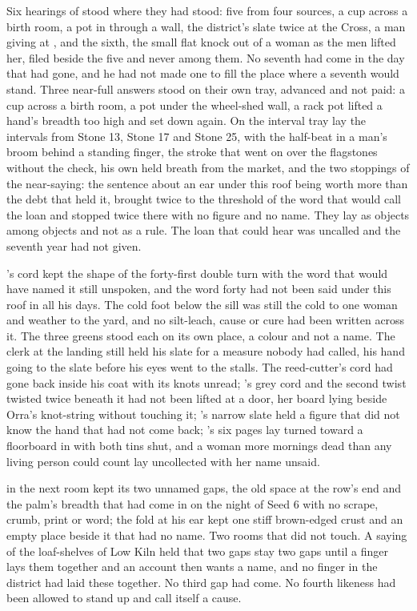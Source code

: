 Six hearings of  stood where they had stood: five from four sources, a cup across a birth room, a pot in  through a wall, the district's slate twice at the Cross, a man giving at , and the sixth, the small flat knock out of a woman as the men lifted her, filed beside the five and never among them. No seventh had come in the day that had gone, and he had not made one to fill the place where a seventh would stand. Three near-full answers stood on their own tray, advanced and not paid: a cup across a birth room, a pot under the wheel-shed wall, a rack pot lifted a hand's breadth too high and set down again. On the interval tray lay the intervals from Stone 13, Stone 17 and Stone 25, with the half-beat in a man's broom behind a standing finger, the stroke that went on over the flagstones without the check, his own held breath from the market, and the two stoppings of the near-saying: the sentence about an ear under this roof being worth more than the debt that held it, brought twice to the threshold of the word that would call the loan and stopped twice there with no figure and no name. They lay as objects among objects and not as a rule. The loan that could hear was uncalled and the seventh year had not given.

's cord kept the shape of the forty-first double turn with the word that would have named it still unspoken, and the word forty had not been said under this roof in all his days. The cold foot below the sill was still the cold to one woman and weather to the yard, and no silt-leach, cause or cure had been written across it. The three greens stood each on its own place, a colour and not a name. The clerk at the landing still held his slate for a measure nobody had called, his hand going to the slate before his eyes went to the stalls. The reed-cutter's cord had gone back inside his coat with its knots unread; 's grey cord and the second twist twisted twice beneath it had not been lifted at a door, her board lying beside Orra's knot-string without touching it; 's narrow slate held a figure that did not know the hand that had not come back; 's six pages lay turned toward a floorboard in  with both tins shut, and a woman more mornings dead than any living person could count lay uncollected with her name unsaid.

 in the next room kept its two unnamed gaps, the old space at the row's end and the palm's breadth that had come in on the night of Seed 6 with no scrape, crumb, print or word; the fold at his ear kept one stiff brown-edged crust and an empty place beside it that had no name. Two rooms that did not touch. A saying of the loaf-shelves of Low Kiln held that two gaps stay two gaps until a finger lays them together and an account then wants a name, and no finger in the district had laid these together. No third gap had come. No fourth likeness had been allowed to stand up and call itself a cause.

